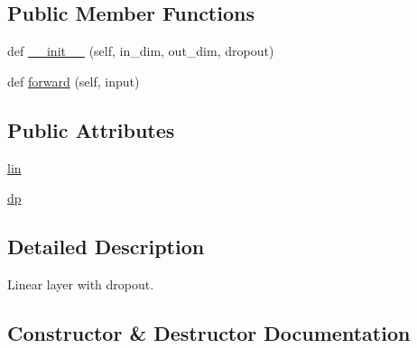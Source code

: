 \subsection*{Public Member Functions}
\begin{DoxyCompactItemize}
\item 
def \hyperlink{classprojects_1_1personality__captions_1_1transresnet_1_1modules_1_1LinearWrapper_a2e10c4bb01e3df60871dc6b0ac5c88a7}{\+\_\+\+\_\+init\+\_\+\+\_\+} (self, in\+\_\+dim, out\+\_\+dim, dropout)
\item 
def \hyperlink{classprojects_1_1personality__captions_1_1transresnet_1_1modules_1_1LinearWrapper_a01b6a807a29f852bbd6109ce1f105f6b}{forward} (self, input)
\end{DoxyCompactItemize}
\subsection*{Public Attributes}
\begin{DoxyCompactItemize}
\item 
\hyperlink{classprojects_1_1personality__captions_1_1transresnet_1_1modules_1_1LinearWrapper_a8411866655bcc0a2d1f81872d690f0bd}{lin}
\item 
\hyperlink{classprojects_1_1personality__captions_1_1transresnet_1_1modules_1_1LinearWrapper_a82d3bfca084c402ccc7d94e8db852610}{dp}
\end{DoxyCompactItemize}


\subsection{Detailed Description}
\begin{DoxyVerb}Linear layer with dropout.
\end{DoxyVerb}
 

\subsection{Constructor \& Destructor Documentation}
\mbox{\label{classprojects_1_1personality__captions_1_1transresnet_1_1modules_1_1LinearWrapper_a2e10c4bb01e3df60871dc6b0ac5c88a7}} 
